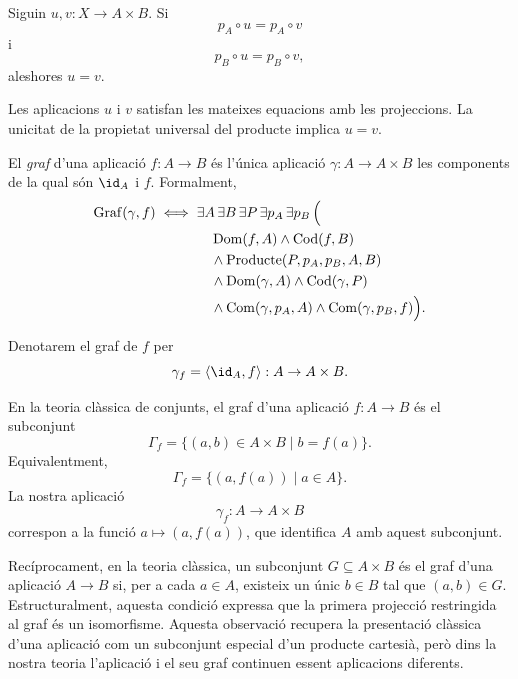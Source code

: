 \begin{proposicio}\label{prop:projeccions-separen}
Siguin \(u,v:X\to A\times B\). Si
\[
p_A\circ u=p_A\circ v
\]
i
\[
p_B\circ u=p_B\circ v,
\]
aleshores \(u=v\).
\end{proposicio}

\begin{prova}
Les aplicacions \(u\) i \(v\) satisfan les mateixes equacions amb les projeccions. La unicitat de la propietat universal del producte implica \(u=v\).
\end{prova}

\begin{definicio}[Graf]\label{def:graf}
El \emph{graf} d'una aplicació \(f:A\to B\) és l'única aplicació \(\gamma:A\to A\times B\) les components de la qual són \(\id_A\) i \(f\). Formalment,
\[
\begin{aligned}
\operatorname{Graf}(\gamma,f)
\iff {}&
\exists A\,\exists B\,\exists P\,\exists p_A\,\exists p_B\,\Bigl(
\\
&\quad\operatorname{Dom}(f,A)\land\operatorname{Cod}(f,B)
\\
&\quad{}\land\operatorname{Producte}(P,p_A,p_B,A,B)
\\
&\quad{}\land\operatorname{Dom}(\gamma,A)\land\operatorname{Cod}(\gamma,P)
\\
&\quad{}\land\operatorname{Com}(\gamma,p_A,A)\land\operatorname{Com}(\gamma,p_B,f)
\Bigr).
\end{aligned}
\]
\end{definicio}

\begin{notacio}[Graf]\label{not:graf}
Denotarem el graf de \(f\) per
\[
\gamma_f=\langle\id_A,f\rangle:A\to A\times B.
\]
\end{notacio}

\begin{observacio}\label{obs:graf-classic}
En la teoria clàssica de conjunts, el graf d'una aplicació \(f:A\to B\) és el subconjunt
\[
\Gamma_f=\{(a,b)\in A\times B\mid b=f(a)\}.
\]
Equivalentment,
\[
\Gamma_f=\{(a,f(a))\mid a\in A\}.
\]
La nostra aplicació
\[
\gamma_f:A\to A\times B
\]
correspon a la funció \(a\mapsto(a,f(a))\), que identifica \(A\) amb aquest subconjunt.

Recíprocament, en la teoria clàssica, un subconjunt \(G\subseteq A\times B\) és el graf d'una aplicació \(A\to B\) si, per a cada \(a\in A\), existeix un únic \(b\in B\) tal que \((a,b)\in G\). Estructuralment, aquesta condició expressa que la primera projecció restringida al graf és un isomorfisme. Aquesta observació recupera la presentació clàssica d'una aplicació com un subconjunt especial d'un producte cartesià, però dins la nostra teoria l'aplicació i el seu graf continuen essent aplicacions diferents.
\end{observacio}

